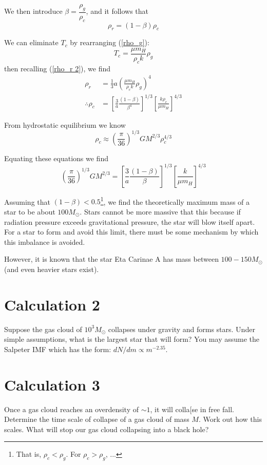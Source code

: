 \documentclass[a4paper]{article} %
\begin{document}
We then introduce $\beta=\dfrac{\rho_g}{\rho_c}$, and it follows that
\begin{equation}
\rho_r=(1-\beta)\rho_c
\end{equation}

We can eliminate $T_c$ by rearranging (\ref{rho_g}):
\begin{equation}
T_c=\frac{\mu m_H}{\rho_c k}\rho_g
\end{equation}
then recalling (\ref{rho_r 2}), we find
\begin{align}
\rho_r&=\frac{1}{3}a\left(\frac{\mu m_H}{\rho_c k}\rho_g\right)^4\\
\therefore \rho_c&=\left[\frac{3}{a}\frac{(1-\beta)}{\beta^4}\right]^{1/3}\left[\frac{k\rho_c}{\mu m_H}\right]^{4/3}
\end{align}

From hydrostatic equilibrium we know
\begin{equation}
\rho_c\approx \left(\frac{\pi}{36}\right)^{1/3}GM^{2/3}\rho_c^{4/3}
\end{equation}

Equating these equations we find
\begin{equation}
\left(\frac{\pi}{36}\right)^{1/3}GM^{2/3}=\left[\frac{3}{a}\frac{(1-\beta)}{\beta}\right]^{1/3}\left[\frac{k}{\mu m_H}\right]^{4/3}
\end{equation}

Assuming that $(1-\beta)<0.5$\footnote{That is, $\rho_c<\rho_g$. For $\rho_c>\rho_g$, ...}, we find the theoretically maximum mass of a star to be about $100M_{\odot}$. Stars cannot be more massive that this because if radiation pressure exceeds gravitational pressure, the star will blow itself apart. For a star to form and avoid this limit, there must be some mechanism by which this imbalance is avoided.

However, it is known that the star Eta Carinae A has mass between $100-150M_{\odot}$ (and even heavier stars exist). 



\section{Calculation 2}
\begin{framed}
Suppose the gas cloud of $10^3 M_{\odot}$ collapses under gravity and forms stars. Under simple assumptions, what is the largest star that will form? You may assume the Salpeter IMF which has the form: $dN/dm\propto m^{-2.35}$.
\end{framed}

\section{Calculation 3}
\begin{framed}
Once a gas cloud reaches an overdensity of $\sim 1$, it will colla[se in free fall. Determine the time scale of collapse of a gas cloud of mass $M$. Work out how this scales. What will stop our gas cloud collapsing into a black hole?
\end{framed}
\end{document}

